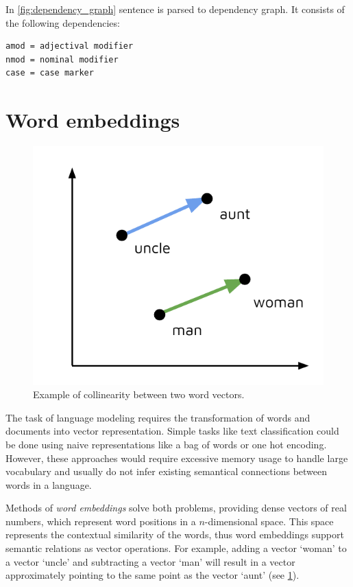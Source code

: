 In \cref{fig:dependency_graph} sentence  is parsed to dependency graph. It consists of the following dependencies: 

\begin{verbatim}
amod = adjectival modifier
nmod = nominal modifier
case = case marker
\end{verbatim}

\section{Word embeddings}

\begin{figure}[h]
\centering
\includegraphics{Figures/word_embeddings}
\decoRule
\caption[Word vectors]{Example of collinearity between two word vectors.}
\label{fig:word_embeddings}
\end{figure}

The task of language modeling requires the transformation of words and documents into vector representation. Simple tasks like text classification could be done using naive representations like a bag of words or one hot encoding. However, these approaches would require excessive memory usage to handle large vocabulary and usually do not infer existing semantical connections between words in a language. 

Methods of \emph{word embeddings} solve both problems, providing dense vectors of real numbers, which represent word positions in a $n$-dimensional space. This space represents the contextual similarity of the words, thus word embeddings support semantic relations as vector operations. For example, adding a vector ‘woman’ to a vector ‘uncle’ and subtracting a vector ‘man’ will result in a vector approximately pointing to the same point as the vector ‘aunt’ (see \cref{fig:word_embeddings}).

